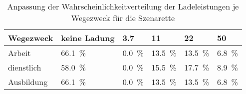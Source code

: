 {
\renewcommand{\arraystretch}{1.2}%
\begin{table}[H]
	\begin{center}
		\caption{Anpassung der Wahrscheinlichkeitverteilung der Ladeleistungen je Wegezweck für die Szenarette}
		\begin{tabu} to \textwidth {X[1.2] X[1.2, r] X[1, r] X[1, r] X[1, r] X[1, r]}
			\hline
			Wegezweck  & keine Ladung        & \SI{3.7}{\kw}      & \SI{11}{\kw}        & \SI{22}{\kw}        & \SI{50}{\kw}       \\ \hline
			Arbeit     & \SI{66.1}{\percent} & \SI{0.0}{\percent} & \SI{13.5}{\percent} & \SI{13.5}{\percent} & \SI{6.8}{\percent} \\
			dienstlich & \SI{58.0}{\percent} & \SI{0.0}{\percent} & \SI{15.5}{\percent} & \SI{17.7}{\percent} & \SI{8.9}{\percent} \\
			Ausbildung & \SI{66.1}{\percent} & \SI{0.0}{\percent} & \SI{13.5}{\percent} & \SI{13.5}{\percent} & \SI{6.8}{\percent} \\ \hline
		\end{tabu}
		\label{tab:WegezweckProbabilitySzenarette}
	\end{center}
	\vspace{-3mm}%
\end{table}
}